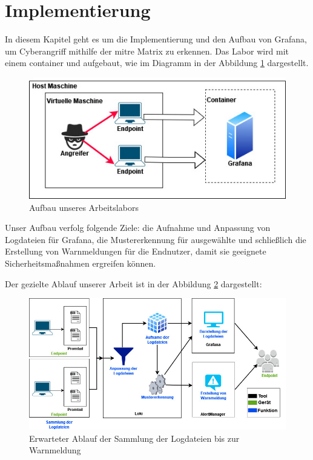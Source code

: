 \section{Implementierung}
In diesem Kapitel geht es um die Implementierung und den Aufbau von Grafana, um \gls{Cyberangriff} mithilfe der \gls{mitre} Matrix zu erkennen. Das Labor wird mit einem \gls{container} und  aufgebaut, wie im Diagramm in der Abbildung \ref{fig:Arbeitslabor} dargestellt.

\begin{figure}[H]
   \centering
   \includegraphics[width=1\textwidth]{assets/Arbeitslabor.jpg}
   \caption[Aufbau unseres Arbeitslabors]
   {Aufbau unseres Arbeitslabors}
   \label{fig:Arbeitslabor}
   \centering
\end{figure}

Unser Aufbau verfolg folgende Ziele: die Aufnahme und Anpassung von Logdateien für Grafana, die Mustererkennung für ausgewählte  und schließlich die Erstellung von Warnmeldungen für die Endnutzer, damit sie geeignete Sicherheitsmaßnahmen ergreifen können.

\newpage
Der gezielte Ablauf unserer Arbeit ist in der Abbildung \ref{fig:Ablauf_grafana2} dargestellt:

\begin{figure}[H]
   \centering
   \includegraphics[width=1\textwidth]{assets/Ablauf_grafana2.jpg}
   \caption[Erwarteter Ablauf der Sammlung der Logdateien bis zur Warnmeldung]
   {Erwarteter Ablauf der Sammlung der Logdateien bis zur Warnmeldung}
   \label{fig:Ablauf_grafana2}
   \centering
\end{figure}

